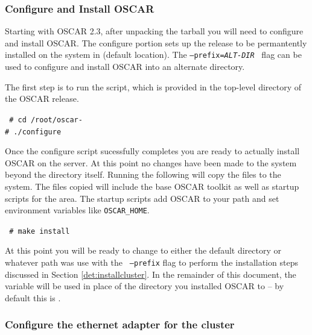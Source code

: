
\subsubsection{Configure and Install OSCAR}
\label{det:configure-install}

Starting with OSCAR 2.3, after unpacking the tarball you will need to
configure and install OSCAR.  The configure portion sets up the release to
be permantently installed on the system in  (default
location).  The {\tt --prefix=\emph{ALT-DIR}} $\,$ flag can be used to
configure and install OSCAR into an alternate directory.  

The first step is to run the  script, which is provided in
the top-level directory of the OSCAR release.  

  \vspace{11pt} {\tt
          \# cd /root/oscar-\oscarversion \\
  \indent \# ./configure }  \vspace{11pt} 

Once the configure script sucessfully completes you are ready to actually
install OSCAR on the server.  At this point no changes have been made to
the system beyond the  directory itself.  Running
the following will copy the files to the system.  The files copied will
include the base OSCAR toolkit as well as startup scripts for the
 area.  The startup scripts add OSCAR to your path and set
environment variables like {\tt OSCAR\_HOME}.

  \vspace{11pt} {\tt
  \indent \# make install} \vspace{11pt}


At this point you will be ready to change to either the default
 directory or whatever path was use with the {\tt
--prefix} flag to perform the installation steps discussed in Section
\ref{det:installcluster}.
\begchange
  In the remainder of this document, the variable  will
be used in place of the directory you installed OSCAR to -- by default
this is .
\endchange



\subsubsection{Configure the ethernet adapter for the cluster} 
\label{det:serveradapter}

